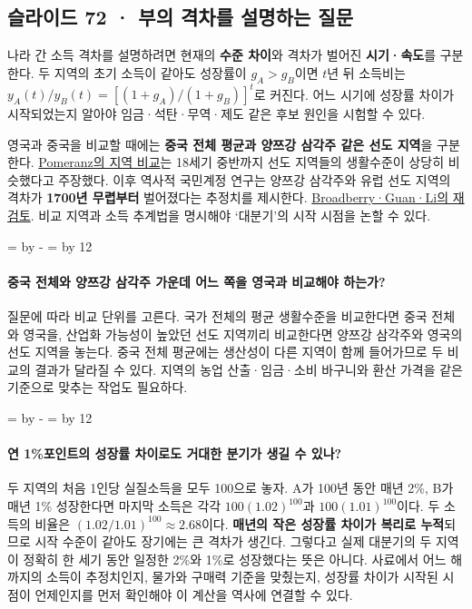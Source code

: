 \documentclass[10pt,a4paper]{article}
\newcommand{\ReserveQuestionSpace}{%
  \par\begingroup
  \dimen0=\pagegoal \advance\dimen0 by -\pagetotal
  \dimen2=\baselineskip \multiply\dimen2 by 12
  \ifdim\dimen0<\dimen2 \newpage\fi
  \endgroup}
\begin{document}
\subsection{슬라이드 72 · 부의 격차를 설명하는 질문}
나라 간 소득 격차를 설명하려면 현재의 \textbf{수준 차이}와 격차가 벌어진 \textbf{시기·속도}를 구분한다. 두 지역의 초기 소득이 같아도 성장률이 $g_A>g_B$이면 $t$년 뒤 소득비는 $y_A(t)/y_B(t)=[(1+g_A)/(1+g_B)]^t$로 커진다. 어느 시기에 성장률 차이가 시작되었는지 알아야 임금·석탄·무역·제도 같은 후보 원인을 시험할 수 있다.\par

영국과 중국을 비교할 때에는 \textbf{중국 전체 평균과 양쯔강 삼각주 같은 선도 지역}을 구분한다. \href{https://www.jstor.org/stable/j.ctt7sv80}{Pomeranz의 지역 비교}는 18세기 중반까지 선도 지역들의 생활수준이 상당히 비슷했다고 주장했다. 이후 역사적 국민계정 연구는 양쯔강 삼각주와 유럽 선도 지역의 격차가 \textbf{1700년 무렵부터} 벌어졌다는 추정치를 제시한다. \href{https://www.cambridge.org/core/journals/journal-of-economic-history/article/china-europe-and-the-great-divergence-a-restatement/CFE6E6B70578ECF5BD22A17617FC73C8}{Broadberry·Guan·Li의 재검토}. 비교 지역과 소득 추계법을 명시해야 ‘대분기’의 시작 시점을 논할 수 있다.\par

\ReserveQuestionSpace
\paragraph{중국 전체와 양쯔강 삼각주 가운데 어느 쪽을 영국과 비교해야 하는가?}
질문에 따라 비교 단위를 고른다. 국가 전체의 평균 생활수준을 비교한다면 중국 전체와 영국을, 산업화 가능성이 높았던 선도 지역끼리 비교한다면 양쯔강 삼각주와 영국의 선도 지역을 놓는다. 중국 전체 평균에는 생산성이 다른 지역이 함께 들어가므로 두 비교의 결과가 달라질 수 있다. 지역의 농업 산출·임금·소비 바구니와 환산 가격을 같은 기준으로 맞추는 작업도 필요하다.\par

\ReserveQuestionSpace
\paragraph{연 1\%포인트의 성장률 차이로도 거대한 분기가 생길 수 있나?}

두 지역의 처음 1인당 실질소득을 모두 100으로 놓자. A가 100년 동안 매년 2\%, B가 매년 1\% 성장한다면 마지막 소득은 각각 $100(1.02)^{100}$과 $100(1.01)^{100}$이다. 두 소득의 비율은 $(1.02/1.01)^{100}\approx2.68$이다. \textbf{매년의 작은 성장률 차이가 복리로 누적}되므로 시작 수준이 같아도 장기에는 큰 격차가 생긴다. 그렇다고 실제 대분기의 두 지역이 정확히 한 세기 동안 일정한 2\%와 1\%로 성장했다는 뜻은 아니다. 사료에서 어느 해까지의 소득이 추정치인지, 물가와 구매력 기준을 맞췄는지, 성장률 차이가 시작된 시점이 언제인지를 먼저 확인해야 이 계산을 역사에 연결할 수 있다.\par
\end{document}
